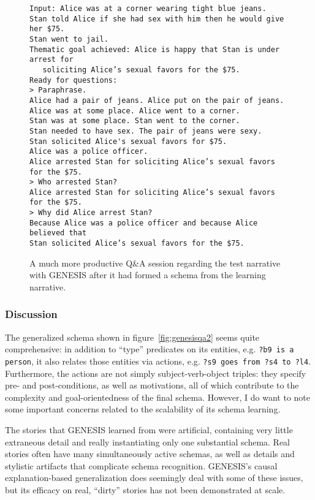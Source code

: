 \begin{figure}
    \begin{lstlisting}[frame=single]
Input: Alice was at a corner wearing tight blue jeans.
Stan told Alice if she had sex with him then he would give her $75.
Stan went to jail.
Thematic goal achieved: Alice is happy that Stan is under arrest for
   soliciting Alice’s sexual favors for the $75.
Ready for questions:
> Paraphrase.
Alice had a pair of jeans. Alice put on the pair of jeans.
Alice was at some place. Alice went to a corner.
Stan was at some place. Stan went to the corner.
Stan needed to have sex. The pair of jeans were sexy.
Stan solicited Alice's sexual favors for $75.
Alice was a police officer.
Alice arrested Stan for soliciting Alice’s sexual favors for the $75.
> Who arrested Stan?
Alice arrested Stan for soliciting Alice’s sexual favors for the $75.
> Why did Alice arrest Stan?
Because Alice was a police officer and because Alice believed that
Stan solicited Alice’s sexual favors for the $75. 
    \end{lstlisting}
\caption{A much more productive Q\&A session regarding the test narrative with GENESIS after it had formed a schema from the learning narrative.}
\label{fig:genesisqa3}
\end{figure}

\addtocounter{footnote}{-2}
 \footnotetext{[sic]}

\subsubsection{Discussion}

The generalized schema shown in figure~\vref{fig:genesisqa2} seems quite comprehensive: in addition to ``type'' predicates on its entities, e.g. \texttt{?b9 is a person}, it also relates those entities via actions, e.g. \texttt{?s9 goes from ?s4 to ?l4}. Furthermore, the actions are not simply subject-verb-object triples: they specify pre- and post-conditions, as well as motivations, all of which contribute to the complexity and goal-orientedness of the final schema. However, I do want to note some important concerns related to the scalability of its schema learning.

The stories that GENESIS learned from were artificial, containing very little extraneous detail and really instantiating only one substantial schema. Real stories often have many simultaneously active schemas, as well as details and stylistic artifacts that complicate schema recognition. GENESIS's causal explanation-based generalization does seemingly deal with some of these issues, but its efficacy on real, ``dirty'' stories has not been demonstrated at scale.

